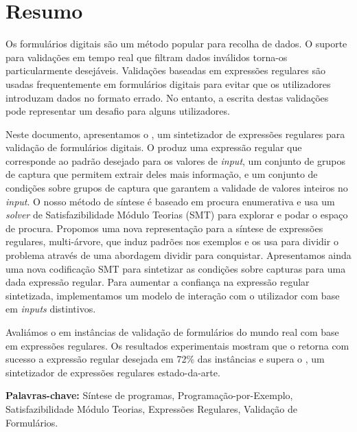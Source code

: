 \section*{Resumo}
Os formulários digitais são um método popular para recolha de dados.
O suporte para validações em tempo real que filtram dados inválidos torna-os particularmente desejáveis.
Validações baseadas em expressões regulares são usadas frequentemente em formulários digitais para evitar que os utilizadores introduzam dados no formato errado.
No entanto, a escrita destas validações pode representar um desafio para alguns utilizadores.

Neste documento, apresentamos o \Forest, um sintetizador de expressões regulares para validação de formulários digitais.
O \Forest produz uma expressão regular que corresponde ao padrão desejado para os valores de \textit{input},
um conjunto de grupos de captura que permitem extrair deles mais informação,
e
um conjunto de condições sobre grupos de captura que garantem a validade de valores inteiros no \textit{input}.
O nosso método de síntese é baseado em procura enumerativa e usa um \textit{solver} de Satisfazibilidade Módulo Teorias (SMT) para explorar e podar o espaço de procura.
Propomos uma nova representação para a síntese de expressões regulares, multi-árvore, que induz padrões nos exemplos e os usa para dividir o problema através de uma abordagem dividir para conquistar.
Apresentamos ainda uma nova codificação SMT para sintetizar as condições sobre capturas para uma dada expressão regular.
Para aumentar a confiança na expressão regular sintetizada, implementamos um modelo de interação com o utilizador com base em \textit{inputs} distintivos.

Avaliámos o \Forest{} em instâncias de validação de formulários do mundo real com base em expressões regulares. Os resultados experimentais mostram que o \Forest{} retorna com sucesso a expressão regular desejada em 72\% das instâncias e supera o \Regel, um sintetizador de expressões regulares estado-da-arte.

\vfill
\noindent
\textbf{\Large Palavras-chave:} Síntese de programas, Programação-por-Exemplo, Satisfazibilidade Módulo Teorias, Expressões Regulares, Validação de Formulários.

\cleardoublepage